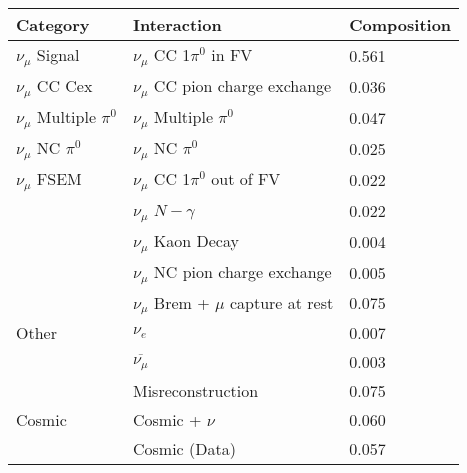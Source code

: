 \begin{table}[H]
\centering
{}
 \begin{tabular}{|l|l|l|}
 \hline
Category & Interaction & Composition \\ [0.1ex] \hline
$\nu_\mu$ Signal & $\nu_\mu$ CC 1$\pi^0$ in FV & 0.561 \\ \hline
$\nu_\mu$ CC Cex & $\nu_\mu$ CC pion charge exchange & 0.036 \\ \hline
$\nu_\mu$ Multiple $\pi^0$ & $\nu_\mu$ Multiple $\pi^0$ & 0.047 \\ \hline
$\nu_\mu$ NC $\pi^0$ & $\nu_\mu$ NC $\pi^0$ & 0.025 \\ \hline
$\nu_\mu$ FSEM & $\nu_\mu$ CC 1$\pi^0$ out of FV & 0.022 \\
& $\nu_\mu$ $N-\gamma$ & 0.022 \\
& $\nu_\mu$ Kaon Decay & 0.004 \\
& $\nu_\mu$ NC pion charge exchange & 0.005 \\ 
&$\nu_\mu$ Brem + $\mu$ capture at rest & 0.075 \\ \hline
Other & $\nu_e$ &0.007 \\
&$\overline{\nu_\mu}$ & 0.003 \\
& Misreconstruction & 0.075 \\ \hline
Cosmic & Cosmic + $\nu$ & 0.060 \\
& Cosmic (Data) & 0.057 \\ \hline
\end{tabular}
\end{table}


